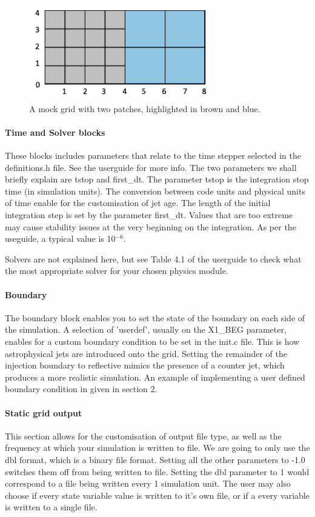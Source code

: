 \documentclass[12pt,a4paper]{report}
\begin{document}
\begin{figure}[h]
	\includegraphics[width=8cm]{gridspaces}
	\centering
	\caption{A mock grid with two patches, highlighted in brown and blue.}
\end{figure}

\paragraph{Time and Solver blocks}\mbox{}
\newline
These blocks includes parameters that relate to the time stepper selected in the definitions.h file. See the userguide for more info. The two parameters we shall briefly explain are tstop and first\_dt. The parameter tstop is the integration stop time (in simulation units). The conversion between code units and physical units of time enable for the customisation of jet age. The length of the initial integration step is set by the parameter first\_dt. Values that are too extreme may cause stability issues at the very beginning on the integration. As per the useguide, a typical value is 10$^{-6}$.

Solvers are not explained here, but see Table 4.1 of the userguide to check what the most appropriate solver for your chosen physics module.

\paragraph{Boundary}\mbox{}
\newline
The boundary block enables you to set the state of the boundary on each side of the simulation. A selection of 'userdef', usually on the X1\_BEG parameter, enables for a custom boundary condition to be set in the init.c file. This is how astrophysical jets are introduced onto the grid. Setting the remainder of the injection boundary to reflective mimics the presence of a counter jet, which produces a more realistic simulation. An example of implementing a user defined boundary condition in given in section 2.

\paragraph{Static grid output}\mbox{}
\newline
This section allows for the customisation of output file type, as well as the frequency at which your simulation is written to file. We are going to only use the dbl format, which is a binary file format. Setting all the other parameters to -1.0 switches them off from being written to file. Setting the dbl parameter to 1 would correspond to a file being written every 1 simulation unit. The user may also choose if every state variable value is written to it's own file, or if a every variable is written to a single file. 
\end{document}
